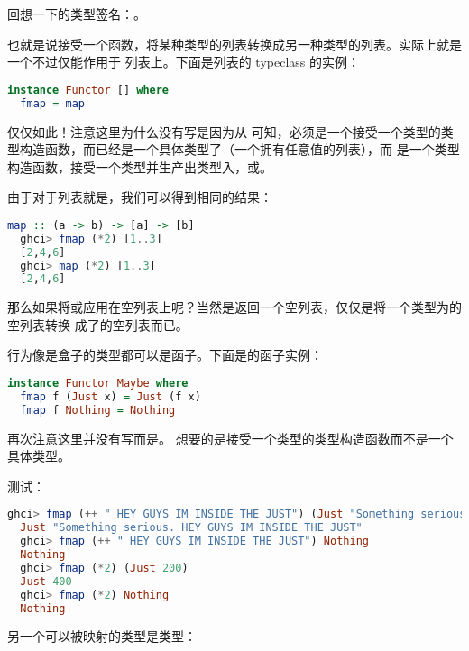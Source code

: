 \documentclass[./main.tex]{subfiles}
\begin{document}
回想一下的类型签名：。

也就是说接受一个函数，将某种类型的列表转换成另一种类型的列表。实际上就是一个不过仅能作用于
列表上。下面是列表的 typeclass 的实例：

\begin{lstlisting}[language=Haskell]
instance Functor [] where
  fmap = map
\end{lstlisting}

仅仅如此！注意这里为什么没有写是因为从
可知，必须是一个接受一个类型的类型构造函数，而\acode{[a]}已经是一个具体类型了（一个拥有任意值的列表），而
\acode{[]}是一个类型构造函数，接受一个类型并生产出类型入\acode{[Int]}，\acode{[String]}或\acode{[[String]]}。

由于对于列表就是，我们可以得到相同的结果：

\begin{lstlisting}[language=Haskell]
  map :: (a -> b) -> [a] -> [b]
  ghci> fmap (*2) [1..3]
  [2,4,6]
  ghci> map (*2) [1..3]
  [2,4,6]
\end{lstlisting}

那么如果将或应用在空列表上呢？当然是返回一个空列表，仅仅是将一个类型为\acode{[a]}的空列表转换
成了\acode{[b]}的空列表而已。

行为像是盒子的类型都可以是函子。下面是的函子实例：

\begin{lstlisting}[language=Haskell]
instance Functor Maybe where
  fmap f (Just x) = Just (f x)
  fmap f Nothing = Nothing
\end{lstlisting}

再次注意这里并没有写而是。
想要的是接受一个类型的类型构造函数而不是一个具体类型。

测试：

\begin{lstlisting}[language=Haskell]
  ghci> fmap (++ " HEY GUYS IM INSIDE THE JUST") (Just "Something serious.")
  Just "Something serious. HEY GUYS IM INSIDE THE JUST"
  ghci> fmap (++ " HEY GUYS IM INSIDE THE JUST") Nothing
  Nothing
  ghci> fmap (*2) (Just 200)
  Just 400
  ghci> fmap (*2) Nothing
  Nothing
\end{lstlisting}

另一个可以被映射的类型是类型：
\end{document}
